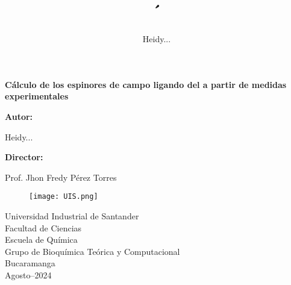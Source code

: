 \documentclass[12pt,a4paper]{article}
\title{´}
\author{Heidy...}
\date{}
\begin{document}

  \begin{center}

	  \LARGE \textbf{C\'alculo de los espinores de campo ligando del  a partir de medidas experimentales}
      
      \vspace{1.3cm}
      \Large \textbf{Autor:}
      \vspace{0.5cm}
      
      {\Large Heidy...}
      
      \vspace{1.3cm}
      
      \Large \textbf{Director:}
      \vspace{0.5cm}
      
      \Large Prof. Jhon Fredy Pérez Torres
      
      \vspace{1.3cm}
      
      \begin{figure}[h]
          \centering
          \texttt{[image: UIS.png]}
      \end{figure}
      
      {\large Universidad Industrial de Santander}\\
      \vspace{0.1cm}
      {\large Facultad de Ciencias}\\
      \vspace{0.1cm}
      {\large Escuela de Qu\'imica}\\
      \vspace{0.1cm}
      {\large Grupo de Bioqu\'imica Te\'orica y Computacional}\\
      \vspace{0.1cm}
      {\large Bucaramanga}\\
      \vspace{0.1cm}
      {\large Agosto--2024}
  \end{center}

\newpage

\tableofcontents
\newpage
\end{document}
